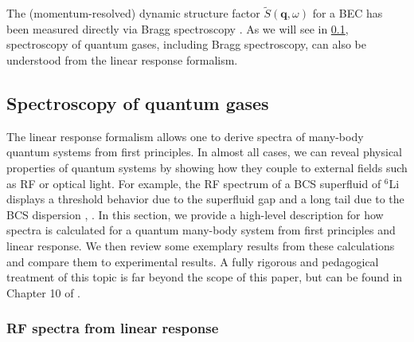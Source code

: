 \documentclass[reprint,
nofootinbib,
amsmath,amssymb,
aps]{revtex4-1}
\begin{document}
The (momentum-resolved) dynamic structure factor $\widetilde{S}(\mathbf{q},\omega)$ for a BEC has been measured directly via Bragg spectroscopy \cite{stenger1999bragg}. As we will see in \ref{sec:spec}, spectroscopy of quantum gases, including Bragg spectroscopy, can also be understood from the linear response formalism. 




\subsection{Spectroscopy of quantum gases}\label{sec:spec}

The linear response formalism allows one to derive spectra of many-body quantum systems from first principles. In almost all cases, we can reveal physical properties of quantum systems by showing how they couple to external fields such as RF or optical light. For example, the RF spectrum of a BCS superfluid of $^6$Li displays a threshold behavior due to the superfluid gap and a long tail due to the BCS dispersion \cite{schirotzek2008determination}, \cite{torma2014quantum}. In this section, we provide a high-level description for how spectra is calculated for a quantum many-body system from first principles and linear response. We then review some exemplary results from these calculations and compare them to experimental results. A fully rigorous and pedagogical treatment of this topic is far beyond the scope of this paper, but can be found in Chapter 10 of \cite{torma2014quantum}. 
 
\subsubsection{RF spectra from linear response}\label{sec:method}
\end{document}
